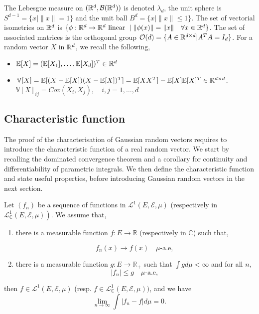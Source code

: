 \documentclass{article}
\begin{document}
The Lebesgue measure on $(\mathbb{R}^{d},\mathcal{B}(\mathbb{R}^{d}))$ is denoted $\lambda_d$, the unit sphere is $S^{d-1} = \{x \mid \|x\|=1\}$ and the
unit ball $B^d = \{x \mid \|x\| \leq 1\}$. The set of vectorial isometries on
$\mathbb{R}^{d}$ is $\{\phi:\mathbb{R}^{d} \to \mathbb{R}^{d} \text{ linear } \mid \|\phi(x)\|=\|x\| \quad \forall x
\in \mathbb{R}^{d} \}$. The set of associated matrices is the orthogonal group $\mathcal{O}(d) = \{A
\in \mathbb{R}^{d \times d} | A^TA = I_d\}$. For a random vector $X$ in $\mathbb{R}^{d}$, we recall the following,

\begin{itemize}
\item $\mathbb{E}[X] = (\mathbb{E}[X_1], \ldots, \mathbb{E}[X_d])^T \in \mathbb{R}^{d}$
\item $\mathbb{V}[X] = \mathbb{E}[(X-\mathbb{E}[X])(X-\mathbb{E}[X])^T] =  \mathbb{E}[XX^T] -  \mathbb{E}[X]\mathbb{E}[X]^T \in
  \mathbb{R}^{d \times d}$. $\mathbb{V}[X]_{ij} = Cov(X_i,X_j), \quad  i,j=1,\ldots,d$             
\end{itemize}

\subsection{Characteristic function}

The proof of the characterisation of Gaussian random vectors requires to introduce the
characteristic function of a real random vector. We start by recalling the dominated
convergence theorem and a corollary for continuity and differentiability of
parametric integrals. We then define the characteristic function and state
useful properties, before introducing Gaussian random vectors in the
next section.

\begin{theorem}
  Let $\left(f_{n}\right)$ be a sequence of functions in  $\mathcal{L}^{1}(E,
  \mathcal{E}, \mu)$ (respectively in  $\left.\mathcal{L}_{\mathbb{C}}^{1}(E,
    \mathcal{E}, \mu)\right) .$ We assume that,

  \begin{enumerate}
  \item there is a measurable function $f:E \to \mathbb{R}$ (respectively in  $\mathbb{C}$) such that,

    $$
    f_{n}(x) \longrightarrow f(x) \quad \mu \text{-a.e, }
    $$
  \item there is a measurable function $g: E \longrightarrow \mathbb{R}_{+}$
    such that $\int g d \mu<\infty$ and for all $n$,
    $$
    \left|f_{n}\right| \leq g \quad \mu\text{-a.e, }
    $$
  \end{enumerate}

  then $f \in \mathcal{L}^{1}(E, \mathcal{E}, \mu)$ (resp. $f
    \in \mathcal{L}_{\mathbb{C}}^{1}(E, \mathcal{E}, \mu))$, and we have
  $$
  \lim _{n \rightarrow \infty} \int |f_{n}-f| d \mu=0.
  $$
\end{theorem}
\end{document}
